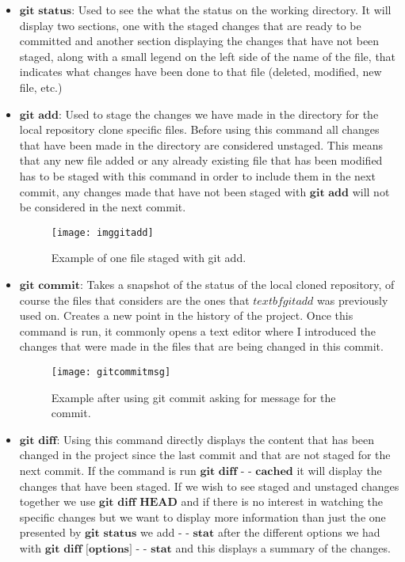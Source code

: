 \label{app:gitcommands}
\begin{itemize}
	\item $\textbf{git status:}$ Used to see the what the status on the working directory. It will display two sections, one with the staged changes that are ready to be committed and another section displaying the changes that have not been staged, along with a small legend on the left side of the name of the file, that indicates what changes have been done to that file (deleted, modified, new file, etc.)

	\item $\textbf{git add:}$ Used to stage the changes we have made in the directory for the local repository clone specific files. Before using this command all changes that have been made in the directory are considered unstaged. This means that any new file added or any already existing file that has been modified has to be staged with this command in order to include them in the next commit, any changes made that have not been staged with $\textbf{git add}$ will not be considered in the next commit.

\begin{figure}[H]
\begin{center}
	\texttt{[image: imggitadd]}

\caption{Example of one file staged with git add.}
\label{fig:imggitadd}
\end{center}
\end{figure}

	\item $\textbf{git commit:}$ Takes a snapshot of the status of the local cloned repository, of course the files that considers are the ones that $textbf{git add}$ was previously used on. Creates a new point in the history of the project. Once this command is run, it commonly opens a text editor where I introduced the changes that were made in the files that are being changed in this commit.
\begin{figure}[H]
\begin{center}
	\texttt{[image: gitcommitmsg]}

\caption{Example after using git commit asking for message for the commit.}
\label{fig:imggitcommit}
\end{center}
\end{figure}

	\item $\textbf{git diff:}$ Using this command directly displays the content that has been changed in the project since the last   commit and that are not staged for the next commit. If the command is run $\textbf{git diff - - cached}$ it will display the changes that have been staged. If we wish to see staged and unstaged changes together we use $\textbf{git diff HEAD}$ and if there is no interest in watching the specific changes but we want to display more information than just the one presented by $\textbf{git status}$ we add $\textbf{- - stat}$ after the different options we had with $\textbf{git diff [options] - - stat}$ and this displays a summary of the changes.


\end{itemize}
